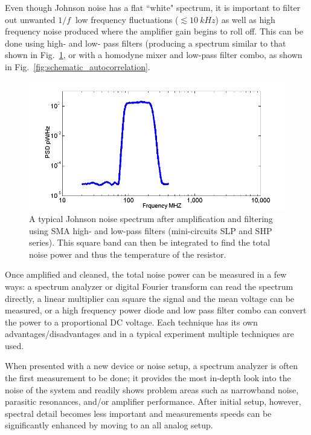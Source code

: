 Even though Johnson noise has a flat ``white" spectrum, it is important to filter out unwanted $1/f~$ low frequency fluctuations ($\lesssim 10~kHz$) as well as high frequency noise produced where the amplifier gain begins to roll off. 
This can be done using high- and low- pass filters (producing a spectrum similar to that shown in Fig.~\ref{fig:Miteq_BP_spec}, or with a homodyne mixer and low-pass filter combo, as shown in Fig.~\ref{fig:schematic_autocorrelation}. 
\begin{figure}
\includegraphics[width=\textwidth]{figures/Johnson_noise_thermometry/Miteq_BP_spec.png}
\caption{A typical Johnson noise spectrum after amplification and filtering using SMA high- and low-pass filters (mini-circuits SLP and SHP series). This square band can then be integrated to find the total noise power and thus the temperature of the resistor.}
\label{fig:Miteq_BP_spec}
\end{figure}

Once amplified and cleaned, the total noise power can be measured in a few ways: a spectrum analyzer or digital Fourier transform can read the spectrum directly, a linear multiplier can square the signal and the mean voltage can be measured, or a high frequency power diode and low pass filter combo can convert the power to a proportional DC voltage. Each technique has its own advantages/disadvantages and in a typical experiment multiple techniques are used. 

When presented with a new device or noise setup, a spectrum analyzer is often the first measurement to be done; it provides the most in-depth look into the noise of the system and readily shows problem areas such as narrowband noise, parasitic resonances, and/or amplifier performance. After initial setup, however, spectral detail becomes less important and measurements speeds can be significantly enhanced by moving to an all analog setup. 

